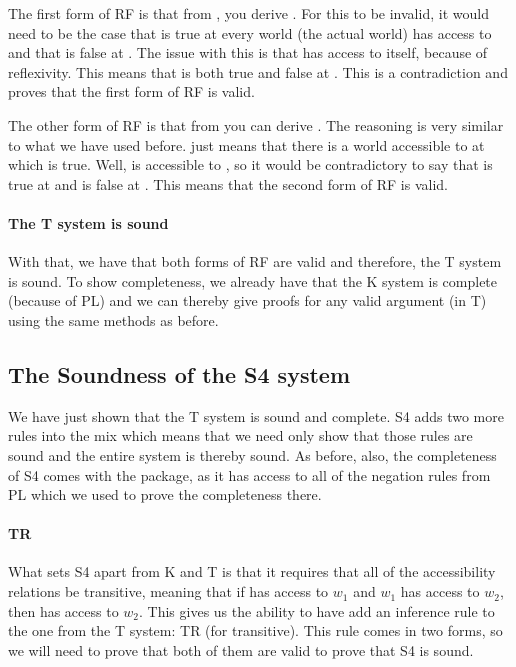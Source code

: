 The first form of RF is that from \ebox{}, you derive . For this to be invalid, it would need to be the case that  is true at every world  (the actual world) has access to and that  is false at . The issue with this is that  has access to itself, because of reflexivity. This means that  is both true and false at . This is a contradiction and proves that the first form of RF is valid.

The other form of RF is that from  you can derive \ediamond{}. The reasoning is very similar to what we have used before. \ediamond{} just means that there is a world accessible to  at which  is true. Well,  is accessible to , so it would be contradictory to say that  is true at  and \ediamond{} is false at . This means that the second form of RF is valid. 

\paragraph{The T system is sound}
With that, we have that both forms of RF are valid and therefore, the T system is sound. To show completeness, we already have that the K system is complete (because of PL) and we can thereby give proofs for any valid argument (in T) using the same methods as before. 

\subsection{The Soundness of the S4 system}
We have just shown that the T system is sound and complete. S4 adds two more rules into the mix which means that we need only show that those rules are sound and the entire system is thereby sound. As before, also, the completeness of S4 comes with the package, as it has access to all of the negation rules from PL which we used to prove the completeness there. 
\paragraph{TR}
What sets S4 apart from K and T is that it requires that all of the accessibility relations be transitive, meaning that if  has access to $w_1$ and $w_1$ has access to $w_2$, then  has access to $w_2$. This gives us the ability to have add an inference rule to the one from the T system: TR (for transitive). This rule comes in two forms, so we will need to prove that both of them are valid to prove that S4 is sound. 


